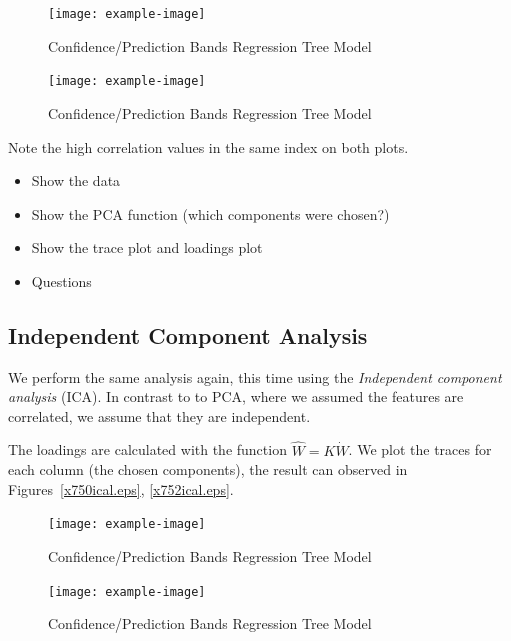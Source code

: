\documentclass[a4paper, twocolumn]{article}
\begin{document}
        \begin{figure}[h!]
          \centering
          \caption{Confidence/Prediction Bands Regression Tree Model}
          \label{fig:x750tp.eps}
          \texttt{[image: example-image]}
        \end{figure}

        \begin{figure}[h!]
          \centering
          \caption{Confidence/Prediction Bands Regression Tree Model}
          \label{fig:x752tp.eps}
          \texttt{[image: example-image]}
        \end{figure}

        Note the high correlation values in the same index on both plots.
        
    \begin{itemize}
        \item Show the data 
        \item Show the PCA function (which components were chosen?)
        \item Show the trace plot and loadings plot
        \item Questions
    \end{itemize}

    \subsection*{Independent Component Analysis}

    We perform the same analysis again, this time using the \emph{Independent component analysis} (ICA). In contrast to to PCA, where we assumed the features are correlated, we assume that they are independent. 

    The loadings are calculated with the function \( \hat{W} = K \dot W \). We plot the traces for each column (the chosen components), the result can observed in Figures~\ref{x750ical.eps}, \ref{x752ical.eps}.

    \begin{figure}[h!]
        \centering
        \caption{Confidence/Prediction Bands Regression Tree Model}
        \label{fig:x750ical.eps}
        \texttt{[image: example-image]}
    \end{figure}

    \begin{figure}[h!]
        \centering
        \caption{Confidence/Prediction Bands Regression Tree Model}
        \label{fig:x752ical.eps}
        \texttt{[image: example-image]}
    \end{figure}
\end{document}
